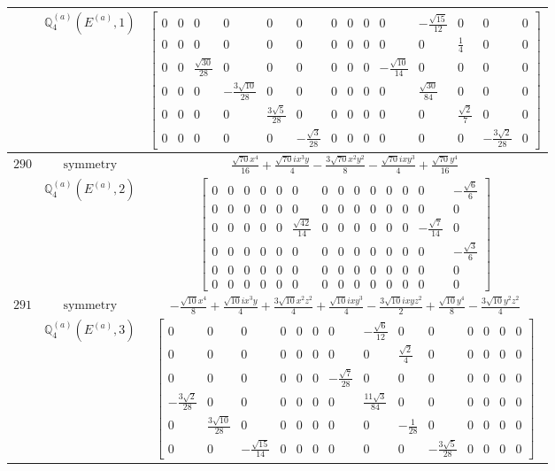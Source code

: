 \documentclass[fleqn,8pt,landscape]{jsarticle}
\begin{document}
\begin{longtable}{ccc}
$  $ & $ \mathbb{Q}_{4}^{(a)}(E^{(a)},1) $ & $ \begin{bmatrix} 0 & 0 & 0 & 0 & 0 & 0 & 0 & 0 & 0 & 0 & - \frac{\sqrt{15}}{12} & 0 & 0 & 0 \\ 0 & 0 & 0 & 0 & 0 & 0 & 0 & 0 & 0 & 0 & 0 & \frac{1}{4} & 0 & 0 \\ 0 & 0 & \frac{\sqrt{30}}{28} & 0 & 0 & 0 & 0 & 0 & 0 & - \frac{\sqrt{10}}{14} & 0 & 0 & 0 & 0 \\ 0 & 0 & 0 & - \frac{3 \sqrt{10}}{28} & 0 & 0 & 0 & 0 & 0 & 0 & \frac{\sqrt{30}}{84} & 0 & 0 & 0 \\ 0 & 0 & 0 & 0 & \frac{3 \sqrt{5}}{28} & 0 & 0 & 0 & 0 & 0 & 0 & \frac{\sqrt{2}}{7} & 0 & 0 \\ 0 & 0 & 0 & 0 & 0 & - \frac{\sqrt{3}}{28} & 0 & 0 & 0 & 0 & 0 & 0 & - \frac{3 \sqrt{2}}{28} & 0 \end{bmatrix} $ \\ \hline
$ 290 $ & $ \text{symmetry} $ & $ \frac{\sqrt{70} x^{4}}{16} + \frac{\sqrt{70} i x^{3} y}{4} - \frac{3 \sqrt{70} x^{2} y^{2}}{8} - \frac{\sqrt{70} i x y^{3}}{4} + \frac{\sqrt{70} y^{4}}{16} $ \\
$  $ & $ \mathbb{Q}_{4}^{(a)}(E^{(a)},2) $ & $ \begin{bmatrix} 0 & 0 & 0 & 0 & 0 & 0 & 0 & 0 & 0 & 0 & 0 & 0 & 0 & - \frac{\sqrt{6}}{6} \\ 0 & 0 & 0 & 0 & 0 & 0 & 0 & 0 & 0 & 0 & 0 & 0 & 0 & 0 \\ 0 & 0 & 0 & 0 & 0 & \frac{\sqrt{42}}{14} & 0 & 0 & 0 & 0 & 0 & 0 & - \frac{\sqrt{7}}{14} & 0 \\ 0 & 0 & 0 & 0 & 0 & 0 & 0 & 0 & 0 & 0 & 0 & 0 & 0 & - \frac{\sqrt{3}}{6} \\ 0 & 0 & 0 & 0 & 0 & 0 & 0 & 0 & 0 & 0 & 0 & 0 & 0 & 0 \\ 0 & 0 & 0 & 0 & 0 & 0 & 0 & 0 & 0 & 0 & 0 & 0 & 0 & 0 \end{bmatrix} $ \\ \hline
$ 291 $ & $ \text{symmetry} $ & $ - \frac{\sqrt{10} x^{4}}{8} + \frac{\sqrt{10} i x^{3} y}{4} + \frac{3 \sqrt{10} x^{2} z^{2}}{4} + \frac{\sqrt{10} i x y^{3}}{4} - \frac{3 \sqrt{10} i x y z^{2}}{2} + \frac{\sqrt{10} y^{4}}{8} - \frac{3 \sqrt{10} y^{2} z^{2}}{4} $ \\
$  $ & $ \mathbb{Q}_{4}^{(a)}(E^{(a)},3) $ & $ \begin{bmatrix} 0 & 0 & 0 & 0 & 0 & 0 & 0 & - \frac{\sqrt{6}}{12} & 0 & 0 & 0 & 0 & 0 & 0 \\ 0 & 0 & 0 & 0 & 0 & 0 & 0 & 0 & \frac{\sqrt{2}}{4} & 0 & 0 & 0 & 0 & 0 \\ 0 & 0 & 0 & 0 & 0 & 0 & - \frac{\sqrt{7}}{28} & 0 & 0 & 0 & 0 & 0 & 0 & 0 \\ - \frac{3 \sqrt{2}}{28} & 0 & 0 & 0 & 0 & 0 & 0 & \frac{11 \sqrt{3}}{84} & 0 & 0 & 0 & 0 & 0 & 0 \\ 0 & \frac{3 \sqrt{10}}{28} & 0 & 0 & 0 & 0 & 0 & 0 & - \frac{1}{28} & 0 & 0 & 0 & 0 & 0 \\ 0 & 0 & - \frac{\sqrt{15}}{14} & 0 & 0 & 0 & 0 & 0 & 0 & - \frac{3 \sqrt{5}}{28} & 0 & 0 & 0 & 0 \end{bmatrix} $ \\ \hline

\end{longtable}
\end{document}
